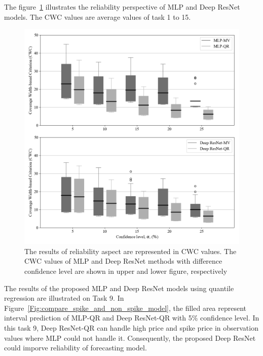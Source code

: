 \documentclass[review]{elsarticle}
\begin{document}
    The figure~\ref{Fig:CWC} illustrates the reliability perspective of MLP and Deep ResNet models.
    The CWC values are average values of task 1 to 15.
    \begin{figure}[H]
      \centering
      \includegraphics[width=12cm]{boxcompare_MV-QR}
      \caption{The results of reliability aspect are represented in CWC values.
      The CWC values of MLP and Deep ResNet methods with difference confidence level are shown in upper and lower figure, respectively}
      \label{Fig:CWC}
    \end{figure}
    The results of the proposed MLP and Deep ResNet models using quantile regression are illustrated on Task 9.
    In Figure~\ref{Fig:compare_spike_and_non_spike_model}, the filled area represent interval prediction of MLP-QR and Deep ResNet-QR with 5$\%$ confidence level.
    In this task 9, Deep ResNet-QR can handle high price and spike price in observation values where MLP could not handle it.
    Consequently, the proposed Deep ResNet could imporve reliability of forecasting model.
\end{document}
